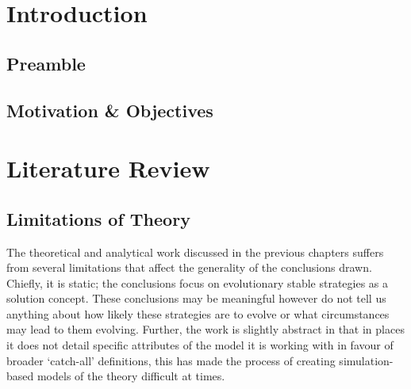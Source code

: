 \documentclass[11pt]{book}
\begin{document}

\tableofcontents
\newpage
\listoffigures
\chapter{Introduction}
\section{Preamble}
\section{Motivation \& Objectives}

\chapter{Literature Review}\label{lit_review}

\section{Limitations of Theory}\label{limits_of_theory}
The theoretical and analytical work discussed in the previous chapters suffers from several limitations that affect the generality of the conclusions drawn. 
Chiefly, it is static; the conclusions focus on evolutionary stable strategies as a solution concept.
These conclusions may be meaningful however do not tell us anything about how likely these strategies are to evolve or what circumstances may lead to them evolving.
Further, the work is slightly abstract in that in places it does not detail specific attributes of the model it is working with in favour of broader `catch-all' definitions,
this has made the process of creating simulation-based models of the theory difficult at times.
\end{document}
